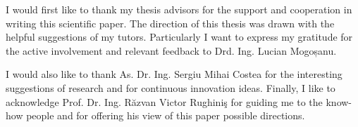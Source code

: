 \vspace*{7cm}
\begin{center}
I would first like to thank my thesis advisors for the support and cooperation in writing this scientific paper.
The direction of this thesis was drawn with the helpful suggestions of my tutors.
Particularly I want to express my gratitude for the active involvement and relevant feedback to Drd. Ing. Lucian Mogoșanu.
\end{center}
\vspace{0.6cm}
\begin{center}
I would also like to thank As. Dr. Ing. Sergiu Mihai Costea for the interesting suggestions of research and for continuous innovation ideas. Finally, I like to acknowledge Prof. Dr. Ing. Răzvan Victor Rughiniş for guiding me to the know-how people and for offering his view of this paper possible directions. 
\end{center}
